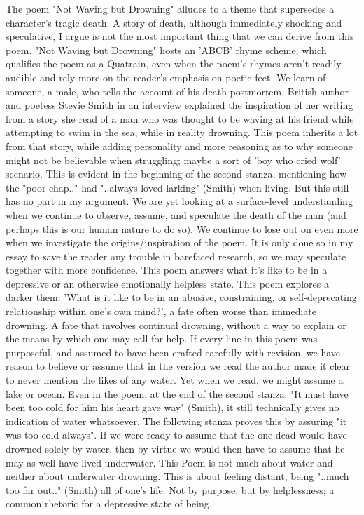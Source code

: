 \markdownRendererDocumentBegin
The poem "Not Waving but Drowning" alludes to a theme that supersedes a character's tragic death. A story of death, although immediately shocking and speculative, I argue is not the most important thing that we can derive from this poem.\markdownRendererInterblockSeparator
{}"Not Waving but Drowning" hosts an 'ABCB' rhyme scheme, which qualifies the poem as a Quatrain, even when the poem's rhymes aren't readily audible and rely more on the reader's emphasis on poetic feet. We learn of someone, a male, who tells the account of his death postmortem. British author and poetess Stevie Smith in an interview explained the inspiration of her writing from a story she read of a man who was thought to be waving at his friend while attempting to swim in the sea, while in reality drowning.\markdownRendererInterblockSeparator
{}This poem inherits a lot from that story, while adding personality and more reasoning as to why someone might not be believable when struggling; maybe a sort of 'boy who cried wolf' scenario. This is evident in the beginning of the second stanza, mentioning how the "poor chap.." had "..always loved larking" (Smith) when living.\markdownRendererInterblockSeparator
{}But this still has no part in my argument. We are yet looking at a surface-level understanding when we continue to observe, assume, and speculate the death of the man (and perhaps this is our human nature to do so). We continue to lose out on even more when we investigate the origins/inspiration of the poem. It is only done so in my essay to save the reader any trouble in barefaced research, so we may speculate together with more confidence.\markdownRendererInterblockSeparator
{}This poem answers what it's like to be in a depressive or an otherwise emotionally helpless state. This poem explores a darker them: 'What is it like to be in an abusive, constraining, or self-deprecating relationship within one's own mind?', a fate often worse than immediate drowning. A fate that involves continual drowning, without a way to explain or the means by which one may call for help.\markdownRendererInterblockSeparator
{}If every line in this poem was purposeful, and assumed to have been crafted carefully with revision, we have reason to believe or assume that in the version we read the author made it clear to never mention the likes of any water. Yet when we read, we might assume a lake or ocean.\markdownRendererInterblockSeparator
{}Even in the poem, at the end of the second stanza: "It must have been too cold for him his heart gave way" (Smith), it still technically gives no indication of water whatsoever. The following stanza proves this by assuring "it was too cold always". If we were ready to assume that the one dead would have drowned solely by water, then by virtue we would then have to assume that he may as well have lived underwater.\markdownRendererInterblockSeparator
{}This Poem is not much about water and neither about underwater drowning. This is about feeling distant, being "..much too far out.." (Smith) all of one's life. Not by purpose, but by helplessness; a common rhetoric for a depressive state of being.\markdownRendererDocumentEnd